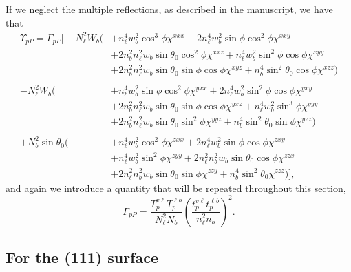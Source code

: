 If we neglect the multiple reflections, as described in the manuscript, we have
that
\begin{equation}\label{eqapp:rppfull}
\begin{split}
\Upsilon_{pP} =
\Gamma_{pP}
\bigg[
- N^{2}_{\ell}W_{b}\big(
&+ n^{4}_{\ell}w^{2}_{b}\cos^{3}\phi\chi^{xxx}
 + 2n^{4}_{\ell}w^{2}_{b}\sin\phi\cos^{2}\phi\chi^{xxy}\\
&+ 2n^{2}_{b}n^{2}_{\ell}w_{b}\sin\theta_{0}\cos^{2}\phi\chi^{xxz}
 + n^{4}_{\ell}w^{2}_{b}\sin^{2}\phi\cos\phi\chi^{xyy}\\
&+ 2n^{2}_{b}n^{2}_{\ell}w_{b}\sin\theta_{0}\sin\phi\cos\phi\chi^{xyz}
 + n^{4}_{b}\sin^{2}\theta_{0}\cos\phi\chi^{xzz}
  \big)\\\\
- N^{2}_{\ell}W_{b}\big(
&+ n^{4}_{\ell}w^{2}_{b}\sin\phi\cos^{2}\phi\chi^{yxx}
 + 2n^{4}_{\ell}w^{2}_{b}\sin^{2}\phi\cos\phi\chi^{yxy}\\
&+ 2n^{2}_{b}n^{2}_{\ell}w_{b}\sin\theta_{0}\sin\phi\cos\phi\chi^{yxz}
 + n^{4}_{\ell}w^{2}_{b}\sin^{3}\phi\chi^{yyy}\\
&+ 2n^{2}_{b}n^{2}_{\ell}w_{b}\sin\theta_{0}\sin^{2}\phi\chi^{yyz}
 + n^{4}_{b}\sin^{2}\theta_{0}\sin\phi\chi^{yzz}
  \big)\\\\
+ N^{2}_{b}\sin\theta_{0}\big(
&+ n^{4}_{\ell}w^{2}_{b}\cos^{2}\phi\chi^{zxx}
 + 2n^{4}_{\ell}w^{2}_{b}\sin\phi\cos\phi\chi^{zxy}\\
&+ n^{4}_{\ell}w^{2}_{b}\sin^{2}\phi\chi^{zyy}
 + 2n^{2}_{\ell}n^{2}_{b}w_{b}\sin\theta_{0}\cos\phi\chi^{zzx}\\
&+ 2n^{2}_{\ell}n^{2}_{b}w_{b}\sin\theta_{0}\sin\phi\chi^{zzy}
 + n^{4}_{b}\sin^{2}\theta_{0}\chi^{zzz}
  \big)
\bigg],
\end{split}
\end{equation}
and again we introduce a quantity that will be repeated throughout this section,
\begin{equation}\label{gammapp}
\Gamma_{pP} =
\frac{T^{v\ell}_{p}T^{\ell b}_{p}}
     {N^{2}_{\ell}N_{b}}
\left(\frac{t^{v\ell}_{p}t^{\ell b}_{p}}
{n^{2}_{\ell}n_{b}}\right)^{2}.
\end{equation}


\subsection{For the (111) surface}

